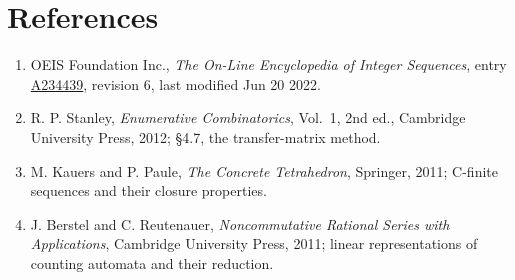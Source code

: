 \documentclass[11pt]{article}
\theoremstyle{definition}
\begin{document}
\section{References}

\begin{enumerate}

\item OEIS Foundation Inc., \emph{The On-Line Encyclopedia of Integer Sequences}, entry \href{https://oeis.org/A234439}{A234439}, revision 6, last modified Jun 20 2022.

\item R. P. Stanley, \emph{Enumerative Combinatorics}, Vol.~1, 2nd ed., Cambridge University Press, 2012; \S4.7, the transfer-matrix method.

\item M. Kauers and P. Paule, \emph{The Concrete Tetrahedron}, Springer, 2011; C-finite sequences and their closure properties.

\item J. Berstel and C. Reutenauer, \emph{Noncommutative Rational Series with Applications}, Cambridge University Press, 2011; linear representations of counting automata and their reduction.

\end{enumerate}
\end{document}
